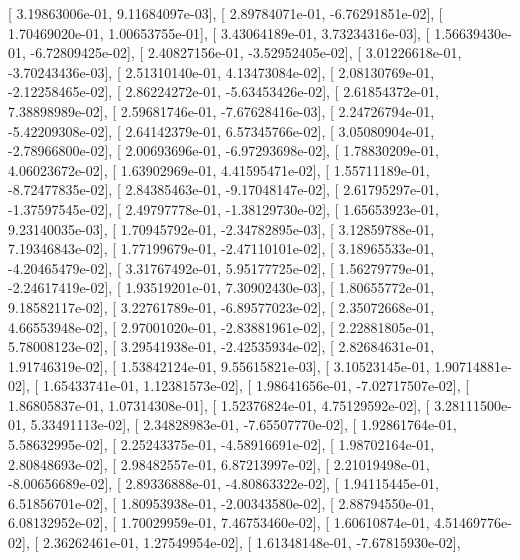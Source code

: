 \documentclass{article}
\begin{document}
       [  3.19863006e-01,   9.11684097e-03],
       [  2.89784071e-01,  -6.76291851e-02],
       [  1.70469020e-01,   1.00653755e-01],
       [  3.43064189e-01,   3.73234316e-03],
       [  1.56639430e-01,  -6.72809425e-02],
       [  2.40827156e-01,  -3.52952405e-02],
       [  3.01226618e-01,  -3.70243436e-03],
       [  2.51310140e-01,   4.13473084e-02],
       [  2.08130769e-01,  -2.12258465e-02],
       [  2.86224272e-01,  -5.63453426e-02],
       [  2.61854372e-01,   7.38898989e-02],
       [  2.59681746e-01,  -7.67628416e-03],
       [  2.24726794e-01,  -5.42209308e-02],
       [  2.64142379e-01,   6.57345766e-02],
       [  3.05080904e-01,  -2.78966800e-02],
       [  2.00693696e-01,  -6.97293698e-02],
       [  1.78830209e-01,   4.06023672e-02],
       [  1.63902969e-01,   4.41595471e-02],
       [  1.55711189e-01,  -8.72477835e-02],
       [  2.84385463e-01,  -9.17048147e-02],
       [  2.61795297e-01,  -1.37597545e-02],
       [  2.49797778e-01,  -1.38129730e-02],
       [  1.65653923e-01,   9.23140035e-03],
       [  1.70945792e-01,  -2.34782895e-03],
       [  3.12859788e-01,   7.19346843e-02],
       [  1.77199679e-01,  -2.47110101e-02],
       [  3.18965533e-01,  -4.20465479e-02],
       [  3.31767492e-01,   5.95177725e-02],
       [  1.56279779e-01,  -2.24617419e-02],
       [  1.93519201e-01,   7.30902430e-03],
       [  1.80655772e-01,   9.18582117e-02],
       [  3.22761789e-01,  -6.89577023e-02],
       [  2.35072668e-01,   4.66553948e-02],
       [  2.97001020e-01,  -2.83881961e-02],
       [  2.22881805e-01,   5.78008123e-02],
       [  3.29541938e-01,  -2.42535934e-02],
       [  2.82684631e-01,   1.91746319e-02],
       [  1.53842124e-01,   9.55615821e-03],
       [  3.10523145e-01,   1.90714881e-02],
       [  1.65433741e-01,   1.12381573e-02],
       [  1.98641656e-01,  -7.02717507e-02],
       [  1.86805837e-01,   1.07314308e-01],
       [  1.52376824e-01,   4.75129592e-02],
       [  3.28111500e-01,   5.33491113e-02],
       [  2.34828983e-01,  -7.65507770e-02],
       [  1.92861764e-01,   5.58632995e-02],
       [  2.25243375e-01,  -4.58916691e-02],
       [  1.98702164e-01,   2.80848693e-02],
       [  2.98482557e-01,   6.87213997e-02],
       [  2.21019498e-01,  -8.00656689e-02],
       [  2.89336888e-01,  -4.80863322e-02],
       [  1.94115445e-01,   6.51856701e-02],
       [  1.80953938e-01,  -2.00343580e-02],
       [  2.88794550e-01,   6.08132952e-02],
       [  1.70029959e-01,   7.46753460e-02],
       [  1.60610874e-01,   4.51469776e-02],
       [  2.36262461e-01,   1.27549954e-02],
       [  1.61348148e-01,  -7.67815930e-02],
\end{document}
